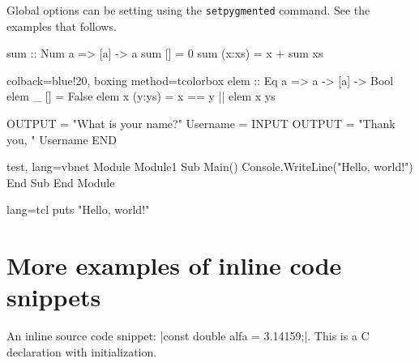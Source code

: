 \documentclass[10pt,a4paper]{article}
\begin{document}
Global options can be setting using the \verb|setpygmented| command.
See the examples that follows.

\begin{Example}

\begin{pygmented}{}
sum :: Num a => [a] -> a
sum [] = 0
sum (x:xs) = x + sum xs
\end{pygmented}
\end{Example}

\begin{Example}
\begin{pygmented}{colback=blue!20, boxing method=tcolorbox}
elem :: Eq a => a -> [a] -> Bool
elem _ [] = False
elem x (y:ys) = x == y || elem x ys
\end{pygmented}
\end{Example}

\begin{Example}

\begin{pygmented}{}
OUTPUT = "What is your name?"
Username = INPUT
OUTPUT = "Thank you, " Username
END
\end{pygmented}
\end{Example}

\begin{Example}

\begin{pygmented}{test, lang=vbnet}
Module Module1
Sub Main()
Console.WriteLine("Hello, world!")
End Sub
End Module
\end{pygmented}
\end{Example}

\begin{Example}
\begin{pygmented}{lang=tcl}
puts "Hello, world!"
\end{pygmented}
\end{Example}

\section{More examples of inline code snippets}

\begin{Example}
An inline source code snippet:
\pyginline[lang=c]|const double alfa = 3.14159;|.
This is a C declaration with initialization.
\end{Example}
\end{document}
